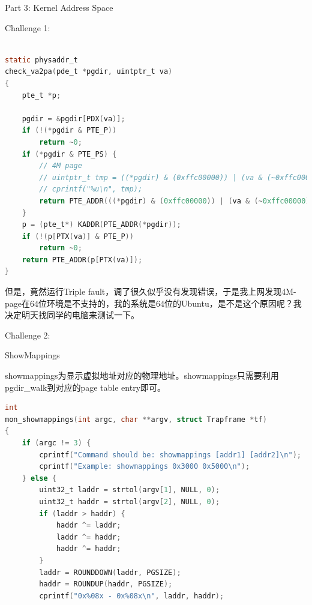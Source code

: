 \documentclass[GBK,winfonts,a4paper,10pt]{ctexart}
\begin{document}
\begin{section}{Part 3: Kernel Address Space}
\begin{subsection}{Challenge 1:}
\begin{lstlisting}[language=C]
                    
static physaddr_t
check_va2pa(pde_t *pgdir, uintptr_t va)
{
	pte_t *p;

	pgdir = &pgdir[PDX(va)];
	if (!(*pgdir & PTE_P))
		return ~0;
	if (*pgdir & PTE_PS) {
		// 4M page
		// uintptr_t tmp = ((*pgdir) & (0xffc00000)) | (va & (~0xffc00000));
		// cprintf("%u\n", tmp);
		return PTE_ADDR(((*pgdir) & (0xffc00000)) | (va & (~0xffc00000)));
	}
	p = (pte_t*) KADDR(PTE_ADDR(*pgdir));
	if (!(p[PTX(va)] & PTE_P))
		return ~0;
	return PTE_ADDR(p[PTX(va)]);
}
\end{lstlisting}
\par
但是，竟然运行Triple fault，调了很久似乎没有发现错误，于是我上网发现4M-page在64位环境是不支持的，我的系统是64位的Ubuntu，是不是这个原因呢？我决定明天找同学的电脑来测试一下。
\end{subsection}

\begin{subsection}{Challenge 2:}
\begin{subsubsection}{ ShowMappings }
\par
showmappings为显示虚拟地址对应的物理地址。showmappings只需要利用pgdir\_walk到对应的page table entry即可。
\begin{lstlisting}[language=C]
int
mon_showmappings(int argc, char **argv, struct Trapframe *tf)
{
    if (argc != 3) {
        cprintf("Command should be: showmappings [addr1] [addr2]\n");
        cprintf("Example: showmappings 0x3000 0x5000\n");
    } else {
        uint32_t laddr = strtol(argv[1], NULL, 0);
        uint32_t haddr = strtol(argv[2], NULL, 0);
        if (laddr > haddr) {
            haddr ^= laddr;
            laddr ^= haddr;
            haddr ^= haddr;
        }
        laddr = ROUNDDOWN(laddr, PGSIZE);
        haddr = ROUNDUP(haddr, PGSIZE);
        cprintf("0x%08x - 0x%08x\n", laddr, haddr);
        

\end{lstlisting}
\end{subsubsection}
\end{subsection}
\end{section}
\end{document}
